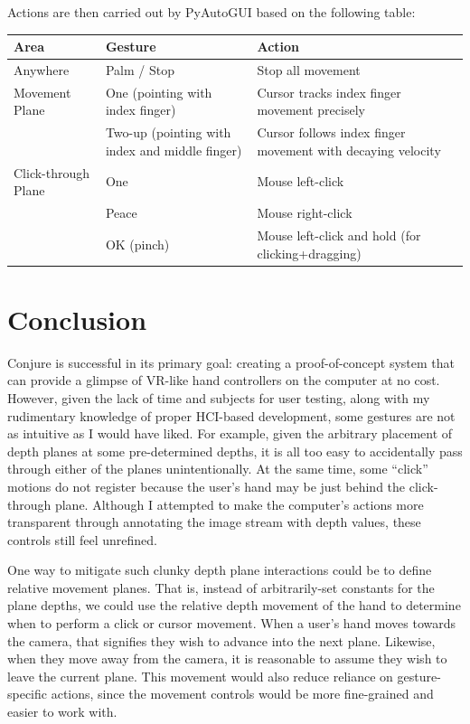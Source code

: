 \documentclass[12pt]{article}
\begin{document}
Actions are then carried out by PyAutoGUI based on the following table:
\begin{table}[h!]
\centering
\begin{tabularx}{\textwidth}{| l | X | X |}
\hline
\textbf{Area} & \textbf{Gesture} & \textbf{Action} \\
\hline
Anywhere & Palm / Stop & Stop all movement \\
\hline
Movement Plane & One (pointing with index finger) & Cursor tracks index finger movement precisely \\
& Two-up (pointing with index and middle finger) & Cursor follows index finger movement with decaying velocity \\
\hline
Click-through Plane & One & Mouse left-click \\
& Peace & Mouse right-click \\
& OK (pinch) & Mouse left-click and hold (for clicking+dragging)\\
\hline
\end{tabularx}
\end{table}

\section{Conclusion}

Conjure is successful in its primary goal: creating a proof-of-concept system that can provide a glimpse of VR-like hand controllers on the computer at no cost. However, given the lack of time and subjects for user testing, along with my rudimentary knowledge of proper HCI-based development, some gestures are not as intuitive as I would have liked. For example, given the arbitrary placement of depth planes at some pre-determined depths, it is all too easy to accidentally pass through either of the planes unintentionally. At the same time, some ``click'' motions do not register because the user's hand may be just behind the click-through plane. Although I attempted to make the computer's actions more transparent through annotating the image stream with depth values, these controls still feel unrefined.

One way to mitigate such clunky depth plane interactions could be to define relative movement planes. That is, instead of arbitrarily-set constants for the plane depths, we could use the relative depth movement of the hand to determine when to perform a click or cursor movement. When a user's hand moves towards the camera, that signifies they wish to advance into the next plane. Likewise, when they move away from the camera, it is reasonable to assume they wish to leave the current plane. This movement would also reduce reliance on gesture-specific actions, since the movement controls would be more fine-grained and easier to work with.
\end{document}
